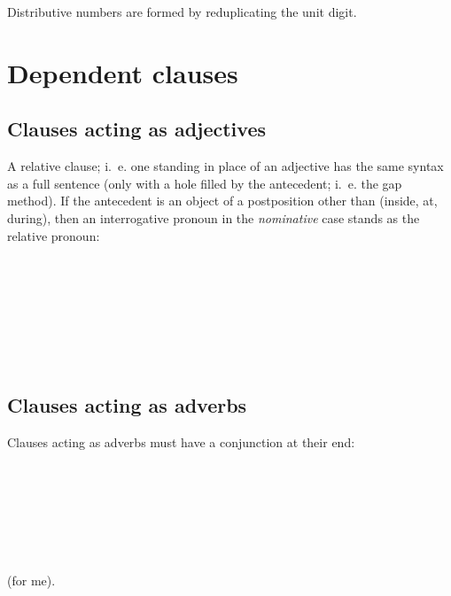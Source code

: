 \documentclass{book}
\begin{document}
Distributive numbers are formed by reduplicating the unit digit.

\chapter{Dependent clauses}

\section{Clauses acting as adjectives}

A relative clause; i.~e. one standing in place of an adjective has the same syntax as a full sentence (only with a hole filled by the antecedent; i.~e. the gap method). If the antecedent is an object of a postposition other than  (inside, at, during), then an interrogative pronoun in the \emph{nominative} case stands as the relative pronoun: \\
~\\
     \\
     \\
     \\
~\\
       \\
       \\
      

\section{Clauses acting as adverbs}

Clauses acting as adverbs must have a conjunction at their end: \\
~\\
     \\
     \\
     \\
~\\
       \\
       \\
       (for me).
\end{document}
